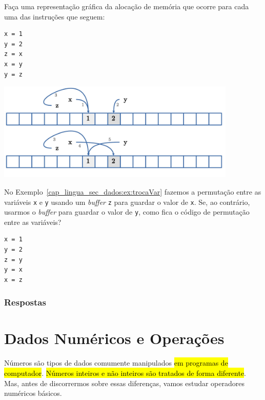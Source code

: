 \begin{exer}
  Faça uma representação gráfica da alocação de memória que ocorre para cada uma das instruções {\python} que seguem:

\begin{lstlisting}
x = 1
y = 2
z = x
x = y
y = z
\end{lstlisting}

\end{exer}
\begin{resp}

  \includegraphics[width=4.5in]{./cap_lingua/dados/fig_aloc_mem/exerPermutacao.jpg}

\end{resp}

\begin{exer}
  No Exemplo~\ref{cap_lingua_sec_dados:ex:trocaVar} fazemos a permutação entre as variáveis \lstinline+x+ e \lstinline+y+ usando um \textit{buffer} \lstinline+z+ para guardar o valor de \lstinline+x+. Se, ao contrário, usarmos o \textit{buffer} para guardar o valor de \lstinline+y+, como fica o código de permutação entre as variáveis?
\end{exer}
\begin{resp}

\begin{lstlisting}
x = 1
y = 2
z = y
y = x
x = z
\end{lstlisting}

\end{resp}

\ifisbook
\subsubsection{Respostas}
\shipoutAnswer
\fi

\section{Dados Numéricos e Operações}\label{cap_lingua_sec_numop}

Números são tipos de dados comumente manipulados \hl{em programas de computador}. \hl{Números inteiros e não inteiros são tratados de forma diferente}. Mas, antes de discorrermos sobre essas diferenças, vamos estudar operadores numéricos básicos.

